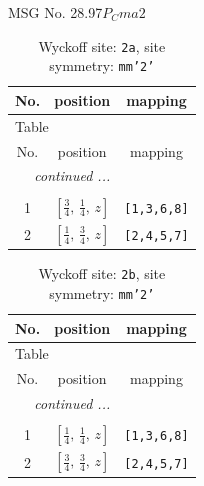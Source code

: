 \documentclass[fleqn,8pt]{jsarticle}
\begin{document}
\setcounter{MaxMatrixCols}{32}

\renewcommand{\tablename}{Table~}
\renewcommand{\figurename}{Figure~}
\begin{center}
\LARGE
MSG No. 28.97\quad$P_{C}ma2$
\end{center}
\renewcommand{\arraystretch}{1.2}
\begin{longtable}{ccc}
\caption{Wyckoff site: {\tt 2a}, site symmetry: {\tt mm'2'}}
 \\
 \hline \hline
No. & position & mapping \\ \hline \endfirsthead

\multicolumn{2}{l}{\tablename\ \thetable{}} \\
 \hline \hline
No. & position & mapping \\ \hline \endhead

 \hline \hline
\multicolumn{2}{r}{\footnotesize\it continued ...} \\ \endfoot

 \hline \hline
\multicolumn{2}{r}{} \\ \endlastfoot

1 & $\left[ \frac{3}{4},\, \frac{1}{4},\, z \right]$ & {\tt [1,3,6,8]} \\ \hline
2 & $\left[ \frac{1}{4},\, \frac{3}{4},\, z \right]$ & {\tt [2,4,5,7]} \\
\end{longtable}
\renewcommand{\arraystretch}{1.2}
\begin{longtable}{ccc}
\caption{Wyckoff site: {\tt 2b}, site symmetry: {\tt mm'2'}}
 \\
 \hline \hline
No. & position & mapping \\ \hline \endfirsthead

\multicolumn{2}{l}{\tablename\ \thetable{}} \\
 \hline \hline
No. & position & mapping \\ \hline \endhead

 \hline \hline
\multicolumn{2}{r}{\footnotesize\it continued ...} \\ \endfoot

 \hline \hline
\multicolumn{2}{r}{} \\ \endlastfoot

1 & $\left[ \frac{1}{4},\, \frac{1}{4},\, z \right]$ & {\tt [1,3,6,8]} \\ \hline
2 & $\left[ \frac{3}{4},\, \frac{3}{4},\, z \right]$ & {\tt [2,4,5,7]} \\
\end{longtable}
\end{document}
